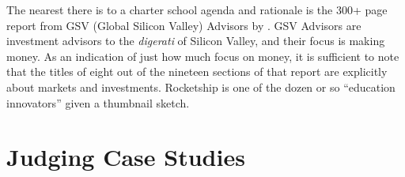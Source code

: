 The nearest there is to a charter school agenda and rationale is the 300+ page report from GSV (Global Silicon Valley) Advisors  by \citeauthor{Moe.etal2012}. GSV Advisors are investment advisors to the \emph{digerati} of Silicon Valley, and their focus is making money. As an indication of just how much  focus on money, it is sufficient to note that the titles of eight out of the nineteen sections of that report are explicitly about markets and investments. Rocketship is one of the dozen or so ``education innovators'' given a thumbnail sketch. %

\section{Judging Case Studies}\label{sec:case-studies}

\begin{comment}
\subsection{Validity}
  \subsection{Reliability}
  \subsection{Limitations}
  \section{Evaluating the Results}
  \section{Rival Explanations}
  \section{Future Research}
\end{comment}



